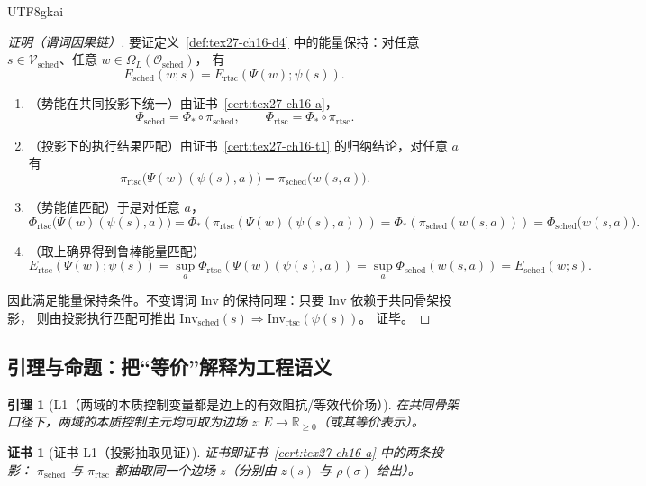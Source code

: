 \documentclass[12pt]{article}
\newtheorem{lemma}{引理}[section]
\newtheorem{Certificate}{证书}[section]
\newcommand{\RR}{\mathbb{R}}
\begin{document}
\begin{CJK*}{UTF8}{gkai}
\begin{proof}[证明（谓词因果链）]
要证定义~\ref{def:tex27-ch16-d4} 中的能量保持：对任意 $s\in\mathcal{V}_{\mathrm{sched}}$、任意 $w\in\Omega_L(\mathcal{O}_{\mathrm{sched}})
  $，
有
\[
  E_{\mathrm{sched}}(w;s)=E_{\mathrm{rtsc}}(\Psi(w);\psi(s)).
\]
\begin{enumerate}
  \item（势能在共同投影下统一）由证书~\ref{cert:tex27-ch16-a}，
  \[
    \Phi_{\mathrm{sched}}=\Phi_\ast\circ\pi_{\mathrm{sched}},
    \qquad
    \Phi_{\mathrm{rtsc}}=\Phi_\ast\circ\pi_{\mathrm{rtsc}}.
  \]
  \item（投影下的执行结果匹配）由证书~\ref{cert:tex27-ch16-t1} 的归纳结论，对任意 $a$ 有
  \[
    \pi_{\mathrm{rtsc}}\bigl(\Psi(w)(\psi(s),a)\bigr)=\pi_{\mathrm{sched}}\bigl(w(s,a)\bigr).
  \]
  \item（势能值匹配）于是对任意 $a$，
  \[
    \Phi_{\mathrm{rtsc}}\bigl(\Psi(w)(\psi(s),a)\bigr)
    =\Phi_\ast\!\left(\pi_{\mathrm{rtsc}}(\Psi(w)(\psi(s),a))\right)
    =\Phi_\ast\!\left(\pi_{\mathrm{sched}}(w(s,a))\right)
    =\Phi_{\mathrm{sched}}\bigl(w(s,a)\bigr).
  \]
  \item（取上确界得到鲁棒能量匹配）
  \[
    E_{\mathrm{rtsc}}(\Psi(w);\psi(s))
    =\sup_a \Phi_{\mathrm{rtsc}}(\Psi(w)(\psi(s),a))
    =\sup_a \Phi_{\mathrm{sched}}(w(s,a))
    =E_{\mathrm{sched}}(w;s).
  \]
\end{enumerate}
因此满足能量保持条件。不变谓词 $\mathrm{Inv}$ 的保持同理：只要 $\mathrm{Inv}$ 依赖于共同骨架投影，
则由投影执行匹配可推出 $\mathrm{Inv}_{\mathrm{sched}}(s)\Rightarrow \mathrm{Inv}_{\mathrm{rtsc}}(\psi(s))$。
证毕。
\end{proof}

\subsection{引理与命题：把“等价”解释为工程语义}
\label{subsec:tex27-ch16-lemmas-props}

\begin{lemma}[L1（两域的本质控制变量都是边上的有效阻抗/等效代价场）]
\label{lem:tex27-ch16-l1}
在共同骨架口径下，两域的本质控制主元均可取为边场 $z:E\to\RR_{\ge 0}$（或其等价表示）。
\end{lemma}

\begin{Certificate}[证书 L1（投影抽取见证）]
\label{cert:tex27-ch16-l1}
证书即证书~\ref{cert:tex27-ch16-a} 中的两条投影：
$\pi_{\mathrm{sched}}$ 与 $\pi_{\mathrm{rtsc}}$ 都抽取同一个边场 $z$（分别由 $z(s)$ 与 $\rho(\sigma)$ 给出）。
\end{Certificate}


\end{CJK*}
\end{document}
